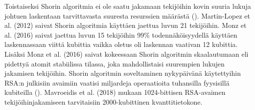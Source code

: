 Toistaiseksi Shorin algoritmia ei ole saatu jakamaan tekijöihin kovin suuria lukuja johtuen laskentaan tarvittavasta suuresta resurssien määrästä (\cite{martin2012experimental}). Martin-Lopez et al. (2012) saivat Shorin algoritmia käyttäen jaettua luvun 21 tekijöihin. Monz et al. (2016) saivat jaettua luvun 15 tekijöihin 99\% todennäköisyydellä käyttäen laskennassaan viittä kubittia vaikka oletus oli laskennan vaativan 12 kubittia. Lisäksi Monz et al. (2016) saivat kokeessaan Shorin algoritmin skaalautumaan eli pidettyä atomit stabiilissa tilassa, joka mahdollistaisi suurempien lukujen jakamisen tekijöihin. Shorin algoritmin soveltaminen nykypäivänä käytettyihin RSA:n julkisiin avaimiin vaatisi miljardeja operaatioita tuhansilla fyysisillä kubiteilla (\cite{bernstein2017post}). Mavroeidis et al. (2018) mukaan 1024-bittisen RSA-avaimen tekijöihinjakamiseen tarvitaisiin 2000-kubittinen kvanttitietokone.